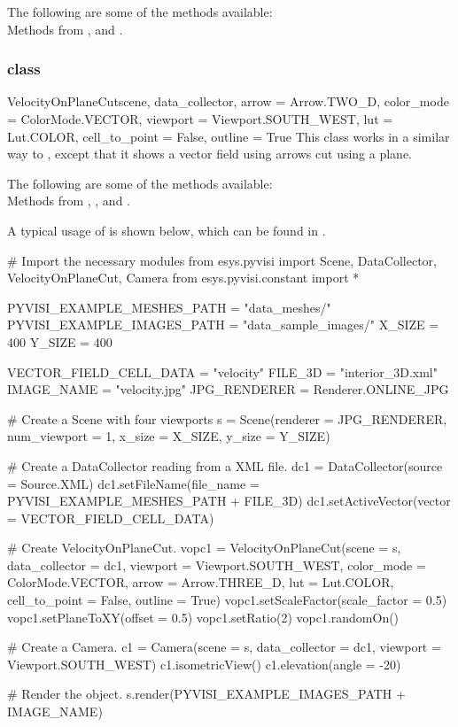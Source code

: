 The following are some of the methods available:\\
Methods from \ActorThreeD, \GlyphThreeD and \MaskPoints. 

\subsubsection{\VelocityOnPlaneCut class}

\begin{classdesc}{VelocityOnPlaneCut}{scene, data_collector, 
arrow = Arrow.TWO_D, color_mode = ColorMode.VECTOR, 
viewport = Viewport.SOUTH_WEST, lut = Lut.COLOR, 
cell_to_point = False, outline = True}
This class works in a similar way to \MapOnPlaneCut, except that 
it shows a vector field using arrows cut using a plane.
\end{classdesc}

The following are some of the methods available:\\
Methods from \ActorThreeD, \GlyphThreeD, \Transform and \MaskPoints. 

A typical usage of \VelocityOnPlaneCut is shown below, which can be found in 
\texttt{\PyvisiExampleDirectory}.

\begin{python}
# Import the necessary modules
from esys.pyvisi import Scene, DataCollector, VelocityOnPlaneCut, Camera
from esys.pyvisi.constant import *

PYVISI_EXAMPLE_MESHES_PATH = "data_meshes/"
PYVISI_EXAMPLE_IMAGES_PATH = "data_sample_images/"
X_SIZE = 400
Y_SIZE = 400

VECTOR_FIELD_CELL_DATA = "velocity"
FILE_3D = "interior_3D.xml"
IMAGE_NAME = "velocity.jpg"
JPG_RENDERER = Renderer.ONLINE_JPG


# Create a Scene with four viewports
s = Scene(renderer = JPG_RENDERER, num_viewport = 1, x_size = X_SIZE, 
        y_size = Y_SIZE)

# Create a DataCollector reading from a XML file.
dc1 = DataCollector(source = Source.XML)
dc1.setFileName(file_name = PYVISI_EXAMPLE_MESHES_PATH + FILE_3D)
dc1.setActiveVector(vector = VECTOR_FIELD_CELL_DATA)

# Create VelocityOnPlaneCut.
vopc1 = VelocityOnPlaneCut(scene = s, data_collector = dc1, 
        viewport = Viewport.SOUTH_WEST, color_mode = ColorMode.VECTOR, 
        arrow = Arrow.THREE_D, lut = Lut.COLOR, cell_to_point = False, 
        outline = True)
vopc1.setScaleFactor(scale_factor = 0.5)
vopc1.setPlaneToXY(offset = 0.5)
vopc1.setRatio(2)
vopc1.randomOn()

# Create a Camera.
c1 = Camera(scene = s, data_collector = dc1, viewport = Viewport.SOUTH_WEST)
c1.isometricView()
c1.elevation(angle = -20)

# Render the object.
s.render(PYVISI_EXAMPLE_IMAGES_PATH + IMAGE_NAME)
\end{python}


